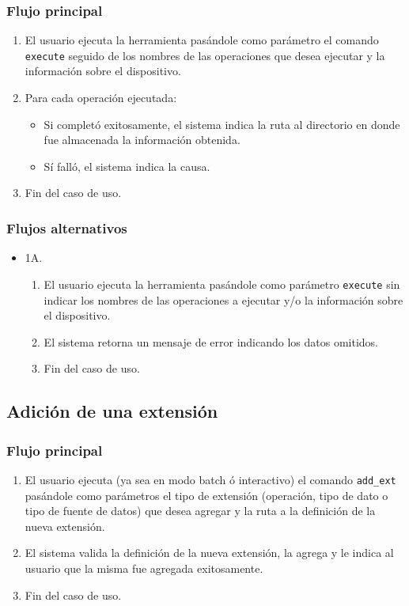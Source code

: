\subsubsection*{Flujo principal}
\begin{enumerate}
\item El usuario ejecuta la herramienta pasándole como parámetro el comando \texttt{execute} seguido de los nombres de las operaciones que desea ejecutar y la información sobre el dispositivo.
\item Para cada operación ejecutada:
    \begin{itemize}
    \item Si completó exitosamente, el sistema indica la ruta al directorio en donde fue almacenada la información obtenida.
    \item Sí falló, el sistema indica la causa.
    \end{itemize}
\item Fin del caso de uso.
\end{enumerate}

\subsubsection*{Flujos alternativos}
\begin{itemize}
\item 1A.
    \begin{enumerate}
    \item El usuario ejecuta la herramienta pasándole como parámetro \texttt{execute} sin indicar los nombres de las operaciones a ejecutar y/o la información sobre el dispositivo.
    \item El sistema retorna un mensaje de error indicando los datos omitidos.
    \item Fin del caso de uso.
    \end{enumerate}
\end{itemize}

\subsection{Adición de una extensión}

\subsubsection*{Flujo principal}
\begin{enumerate}
\item El usuario ejecuta (ya sea en modo batch ó interactivo) el comando \texttt{add\_ext} pasándole como parámetros el tipo de extensión (operación, tipo de dato o tipo de fuente de datos) que desea agregar y la ruta a la definición de la nueva extensión.
\item El sistema valida la definición de la nueva extensión, la agrega y le indica al usuario que la misma fue agregada exitosamente.
\item Fin del caso de uso.
\end{enumerate}

